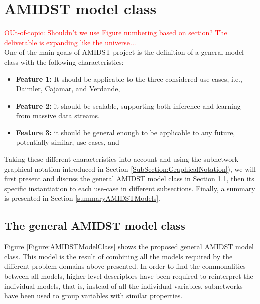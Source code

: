 \section{AMIDST model class}

\textcolor{red}{OUt-of-topic: Shouldn't we use Figure numbering based on section? The deliverable is expanding like the universe...}\\
One of the main goals of AMIDST project is the definition of a general model class with the following characteristics: 

\begin{itemize}
\item \textbf{Feature 1:} It should be applicable to the three considered use-cases, i.e., Daimler, Cajamar, and Verdande,

\item \textbf{Feature 2:} it should be scalable, supporting both inference and learning from massive data streams.

\item \textbf{Feature 3:}  it should be general enough to be applicable to any future, potentially similar, use-cases, and

\end{itemize}

Taking these different characteristics into account and using the subnetwork graphical notation introduced in Section \ref{SubSection:GraphicalNotation}), we will first present and discuss the general AMIDST model class in Section \ref{GeneralModelClass}, then its specific instantiation to each use-case in different subsections. Finally, a summary is presented in Section \ref{summaryAMIDSTModels}.

\subsection{The general AMIDST model class}\label{GeneralModelClass}

Figure \ref{Figure:AMIDSTModelClass} shows the proposed general AMIDST model class. This model is the result of combining all the models required by the different problem domains above presented. In order to find the commonalities between all models, higher-level descriptors have been required to reinterpret the individual models, that is, instead of all the individual variables, subnetworks have been used to group variables with similar properties.


